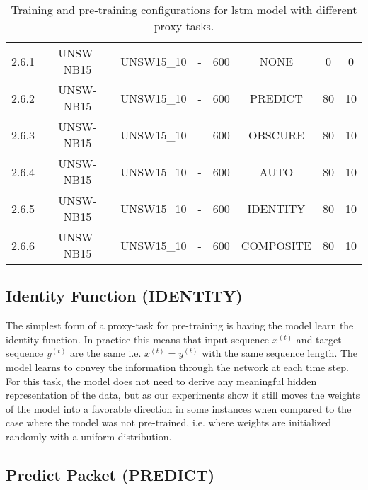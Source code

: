 \begin{table}[h]
{\begin{tabular}{cccccccc}
		2.6.1 \label{ex_2_6_1} & UNSW-NB15    & UNSW15\_10 & -           & 600           & NONE       & 0         & 0           \\
		2.6.2 \label{ex_2_6_2} & UNSW-NB15    & UNSW15\_10 & -           & 600           & PREDICT    & 80        & 10          \\
		2.6.3 \label{ex_2_6_3} & UNSW-NB15    & UNSW15\_10 & -           & 600           & OBSCURE      & 80        & 10          \\
		2.6.4 \label{ex_2_6_4} & UNSW-NB15    & UNSW15\_10 & -           & 600           & AUTO       & 80        & 10          \\
		2.6.5 \label{ex_2_6_5} & UNSW-NB15    & UNSW15\_10 & -           & 600           & IDENTITY   & 80        & 10          \\
		2.6.6 \label{ex_2_6_6} & UNSW-NB15    & UNSW15\_10 & -           & 600           & COMPOSITE  & 80        & 10         
	\end{tabular}}
	\caption{Training and pre-training configurations for \gls{lstm} model with different proxy tasks.}
	\label{table:experiments:lstm:configurations}
\end{table}

\subsection{Identity Function (IDENTITY)} \label{sec:experiments:lstm:identity}

The simplest form of a proxy-task for pre-training is having the model learn the identity function. In practice this means that input sequence $x^{(t)}$ and target sequence $y^{(t)}$ are the same i.e. $x^{(t)} = y^{(t)}$ with the same sequence length. The model learns to convey the information through the network at each time step. For this task, the model does not need to derive any meaningful hidden representation of the data, but as our experiments show it still moves the weights of the model into a favorable direction in some instances when compared to the case where the model was not pre-trained, i.e. where weights are initialized randomly with a uniform distribution.

\subsection{Predict Packet (PREDICT)} \label{sec:experiments:lstm:predict_packet}

